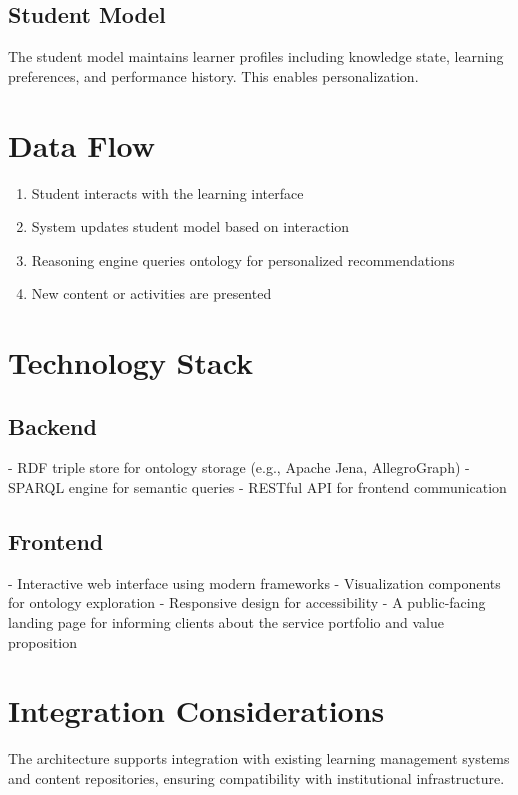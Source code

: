 \subsection{Student Model}

The student model maintains learner profiles including knowledge state, learning preferences, and performance history. This enables personalization.

\section{Data Flow}

\begin{enumerate}
    \item Student interacts with the learning interface
    \item System updates student model based on interaction
    \item Reasoning engine queries ontology for personalized recommendations
    \item New content or activities are presented
\end{enumerate}

\section{Technology Stack}

\subsection{Backend}

- RDF triple store for ontology storage (e.g., Apache Jena, AllegroGraph)
- SPARQL engine for semantic queries
- RESTful API for frontend communication

\subsection{Frontend}

- Interactive web interface using modern frameworks
- Visualization components for ontology exploration
- Responsive design for accessibility
- A public-facing landing page for informing clients about the service portfolio and value proposition

\section{Integration Considerations}

The architecture supports integration with existing learning management systems and content repositories, ensuring compatibility with institutional infrastructure.
